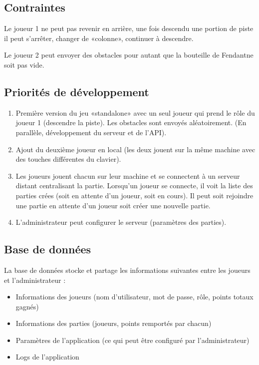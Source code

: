 \documentclass[a4paper,11pt]{article}
\begin{document}
	\subsection{Contraintes}
	Le joueur 1 ne peut pas revenir en arrière, une fois descendu une portion de piste il peut s'arrêter, changer de «colonne», continuer à descendre. \par

	Le joueur 2 peut envoyer des obstacles pour autant que la bouteille de Fendant\texttrademark ne soit pas vide.

	\subsection{Priorités de développement}

	\begin{enumerate}
		\item Première version du jeu «standalone» avec un seul joueur qui prend le rôle du joueur 1 (descendre la piste). Les obstacles sont envoyés aléatoirement. (En parallèle, développement du serveur et de l'API).
		\item Ajout du deuxième joueur en local (les deux jouent sur la même machine avec des touches différentes du clavier).
		\item Les joueurs jouent chacun sur leur machine et se connectent à un serveur distant centralisant la partie. Lorsqu'un joueur se connecte, il voit la liste des parties crées (soit en attente d'un joueur, soit en cours). Il peut soit rejoindre une partie en attente d'un joueur soit créer une nouvelle partie.
		\item L'administrateur peut configurer le serveur (paramètres des parties).
	\end{enumerate}

	\subsection{Base de données}
	La base de données stocke et partage les informations suivantes entre les joueurs et l'administrateur :
	\begin{itemize}
		\item Informations des joueurs (nom d'utilisateur, mot de passe, rôle, points totaux gagnés)
		\item Informations des parties (joueurs, points remportés par chacun)
		\item Paramètres de l'application (ce qui peut être configuré par l'administrateur)
		\item Logs de l'application
	\end{itemize}
\end{document}
